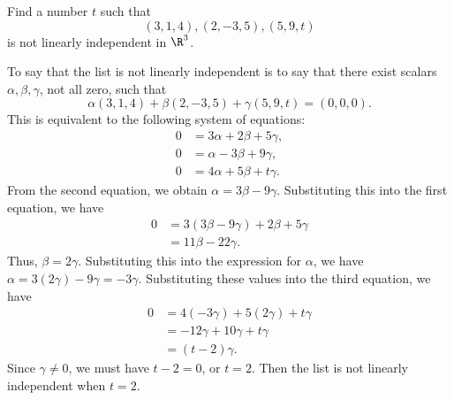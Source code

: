 \begin{exercise}
Find a number $t$ such that
\[ (3,1,4),(2,-3,5),(5,9,t) \]
is not linearly independent in $\R^3$.
\end{exercise}
\begin{solution}
To say that the list is not linearly independent is to say that there exist
scalars $\alpha,\beta,\gamma$, not all zero, such that
\[ \alpha(3,1,4)+\beta(2,-3,5)+\gamma(5,9,t)=(0,0,0). \]
This is equivalent to the following system of equations:
\begin{align*}
0 &= 3\alpha+2\beta+5\gamma,\\
0 &= \alpha-3\beta+9\gamma,\\
0 &= 4\alpha+5\beta+t\gamma.
\end{align*}
From the second equation, we obtain $\alpha=3\beta-9\gamma$. Substituting this
into the first equation, we have
\begin{align*}
0 &= 3(3\beta-9\gamma)+2\beta+5\gamma\\
  &= 11\beta-22\gamma.
\end{align*}
Thus, $\beta=2\gamma$. Substituting this into the expression for $\alpha$, we
have $\alpha=3(2\gamma)-9\gamma=-3\gamma$. Substituting these values into the
third equation, we have
\begin{align*}
0 &= 4(-3\gamma)+5(2\gamma)+t\gamma\\
  &= -12\gamma+10\gamma+t\gamma\\
  &= (t-2)\gamma.
\end{align*}
Since $\gamma\ne0$, we must have $t-2=0$, or $t=2$. Then the list is not
linearly independent when $t=2$.
\end{solution}

